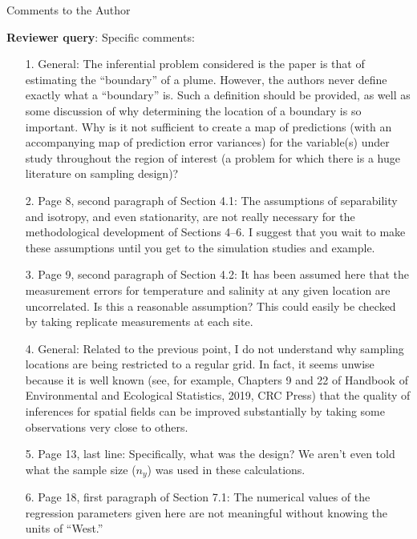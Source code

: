 \documentclass[a4paper]{article}
\def\reply{\textbf{Reviewer query}}
\begin{document}
\begin{answers}

\item{Comments to the Author}\label{q30}

\reply: Specific comments:

\begin{itemize}[noitemsep,topsep=0pt,parsep=0pt,partopsep=0pt]

\item[1.] General: The inferential problem considered is the paper is that of estimating the “boundary”
of a plume. However, the authors never define exactly what a “boundary” is. Such a definition
should be provided, as well as some discussion of why determining the location of a boundary
is so important. Why is it not sufficient to create a map of predictions (with an accompanying
map of prediction error variances) for the variable(s) under study throughout the region of
interest (a problem for which there is a huge literature on sampling design)?


\item[2.] Page 8, second paragraph of Section 4.1: The assumptions of separability and isotropy, and
even stationarity, are not really necessary for the methodological development of Sections 4–6.
I suggest that you wait to make these assumptions until you get to the simulation studies and
example.


\item[3.] Page 9, second paragraph of Section 4.2: It has been assumed here that the measurement
errors for temperature and salinity at any given location are uncorrelated. Is this a reasonable
assumption? This could easily be checked by taking replicate measurements at each site.


\item[4.] General: Related to the previous point, I do not understand why sampling locations are being
restricted to a regular grid. In fact, it seems unwise because it is well known (see, for example,
Chapters 9 and 22 of Handbook of Environmental and Ecological Statistics, 2019, CRC Press)
that the quality of inferences for spatial fields can be improved substantially by taking some
observations very close to others.

\item[5.] Page 13, last line: Specifically, what was the design? We aren’t even told what the sample size
($n_y$) was used in these calculations.

\item[6.] Page 18, first paragraph of Section 7.1: The numerical values of the regression parameters
given here are not meaningful without knowing the units of “West.”


\end{itemize}
\end{answers}
\end{document}

